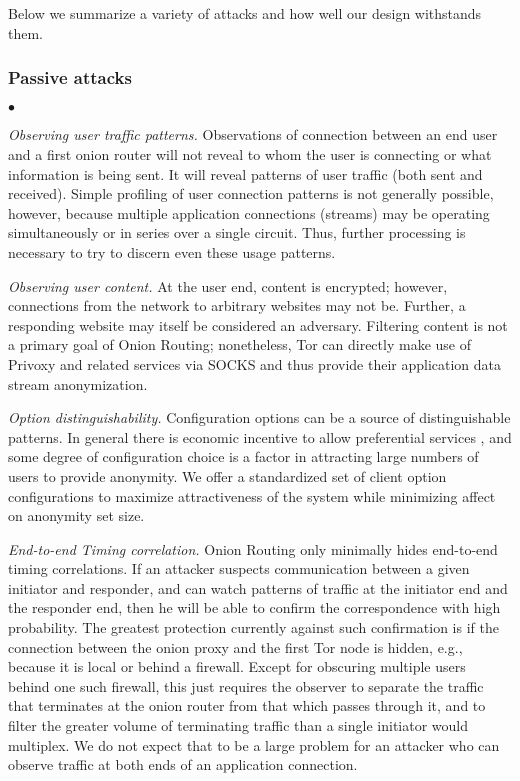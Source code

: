 \documentclass[times,10pt,twocolumn]{article}
\newenvironment{tightlist}{\begin{list}{$\bullet$}{
  \setlength{\itemsep}{0mm}
    \setlength{\parsep}{0mm}
    }}{\end{list}}
\begin{document}
\label{sec:attacks}

Below we summarize a variety of attacks and how well our design withstands
them.

\subsubsection*{Passive attacks}
\begin{tightlist}
\item \emph{Observing user traffic patterns.} Observations of connection
  between an end user and a first onion router will not reveal to whom
  the user is connecting or what information is being sent. It will
  reveal patterns of user traffic (both sent and received). Simple
  profiling of user connection patterns is not generally possible,
  however, because multiple application connections (streams) may be
  operating simultaneously or in series over a single circuit. Thus,
  further processing is necessary to try to discern even these usage
  patterns.
  
\item \emph{Observing user content.} At the user end, content is
  encrypted; however, connections from the network to arbitrary
  websites may not be. Further, a responding website may itself be
  considered an adversary. Filtering content is not a primary goal of
  Onion Routing; nonetheless, Tor can directly make use of Privoxy and
  related services via SOCKS and thus provide their application data
  stream anonymization.


\item \emph{Option distinguishability.} Configuration options can be a
  source of distinguishable patterns. In general there is economic
  incentive to allow preferential services \cite{econymics}, and some
  degree of configuration choice is a factor in attracting large
  numbers of users to provide anonymity. We offer a standardized set
  of client option configurations to maximize attractiveness of the
  system while minimizing affect on anonymity set size.
  
\item \emph{End-to-end Timing correlation.} Onion Routing only
  minimally hides end-to-end timing correlations. If an attacker
  suspects communication between a given initiator and responder, and
  can watch patterns of traffic at the initiator end and the responder
  end, then he will be able to confirm the correspondence with high
  probability. The greatest protection currently against such
  confirmation is if the connection between the onion proxy and the
  first Tor node is hidden, e.g., because it is local or behind a
  firewall. Except for obscuring multiple users behind one such
  firewall, this just requires the observer to separate the traffic
  that terminates at the onion router from that which passes through
  it, and to filter the greater volume of terminating traffic than a
  single initiator would multiplex. We do not expect that to be a
  large problem for an attacker who can observe traffic at both ends
  of an application connection.
  

\end{tightlist}
\end{document}
